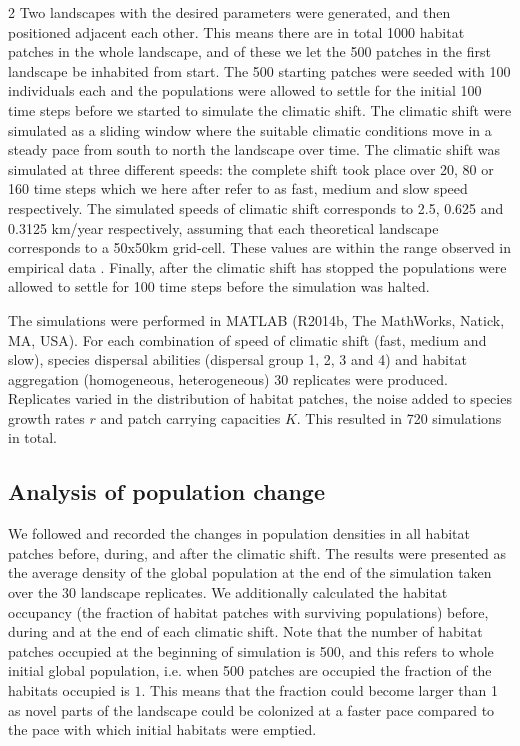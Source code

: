 \documentclass[12pt,pdftex]{article}
\begin{document}
\begin{spacing}{2}
Two landscapes with the desired parameters were generated, and then positioned adjacent each other. This means there are in total 1000 habitat patches in the whole landscape, and of these we let the 500 patches in the first landscape be inhabited from start. The 500 starting patches were seeded with 100 individuals each and the populations were allowed to settle for the initial 100 time steps before we started to simulate the climatic shift. The climatic shift were simulated as a sliding window where the suitable climatic conditions move in a steady pace from south to north the landscape over time. The climatic shift was simulated at three different speeds: the complete shift took place over 20, 80 or 160 time steps which we here after refer to as fast, medium and slow speed respectively. The simulated speeds of climatic shift corresponds to 2.5, 0.625 and 0.3125 km/year respectively, assuming that each theoretical landscape  corresponds to a 50x50km grid-cell. These values are within the range observed in empirical data \citep{Loarie2009}.  Finally, after the climatic shift has stopped the populations were allowed to settle for 100 time steps before the simulation was halted.

The simulations were performed in MATLAB (R2014b, The MathWorks, Natick, MA, USA). For each combination of speed of climatic shift (fast, medium and slow), species dispersal abilities (dispersal group 1, 2, 3 and 4) and habitat aggregation (homogeneous, heterogeneous) 30 replicates were produced. Replicates varied in the distribution of habitat patches, the noise added to species growth rates $r$ and patch carrying capacities $K$. This resulted in 720 simulations in total.

\subsection*{Analysis of population change}
We followed and recorded the changes in population densities in all habitat patches before, during, and after the climatic shift. The results were presented as the average density of the global population at the end of the simulation taken over the 30 landscape replicates. We additionally calculated the habitat occupancy (the fraction of habitat patches with surviving populations) before, during and at the end of each climatic shift. Note that the number of habitat patches occupied at the beginning of simulation is 500, and this refers to whole initial global population, i.e. when 500 patches are occupied the fraction of the habitats occupied is $1$. This means that the fraction could become larger than 1 as novel parts of the landscape could be colonized at a faster pace compared to the pace with which initial habitats were emptied. 


\end{spacing}
\end{document}
